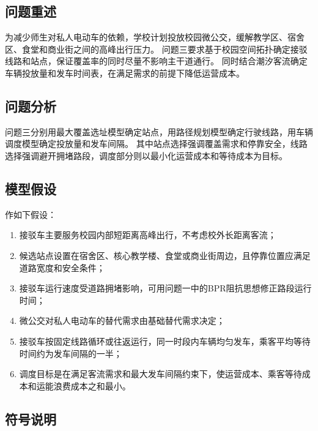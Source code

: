 \documentclass[UTF8,zihao=-4,a4paper]{ctexart}
\numberwithin{table}{section}
\numberwithin{figure}{section}
\numberwithin{equation}{section}
\begin{document}
\subsection{问题重述}

为减少师生对私人电动车的依赖，学校计划投放校园微公交，缓解教学区、宿舍区、食堂和商业街之间的高峰出行压力。
问题三要求基于校园空间拓扑确定接驳线路和站点，保证覆盖率的同时尽量不影响主干道通行。
同时结合潮汐客流确定车辆投放量和发车时间表，在满足需求的前提下降低运营成本。

\subsection{问题分析}

问题三分别用最大覆盖选址模型确定站点，用路径规划模型确定行驶线路，用车辆调度模型确定投放量和发车间隔。
其中站点选择强调覆盖需求和停靠安全，线路选择强调避开拥堵路段，调度部分则以最小化运营成本和等待成本为目标。

\subsection{模型假设}

作如下假设：
\begin{enumerate}
    \item 接驳车主要服务校园内部短距离高峰出行，不考虑校外长距离客流；
    \item 候选站点设置在宿舍区、核心教学楼、食堂或商业街周边，且停靠位置应满足道路宽度和安全条件；
    \item 接驳车运行速度受道路拥堵影响，可用问题一中的BPR阻抗思想修正路段运行时间；
    \item 微公交对私人电动车的替代需求由基础替代需求决定；
    \item 接驳车按固定线路循环或往返运行，同一时段内车辆均匀发车，乘客平均等待时间约为发车间隔的一半；
    \item 调度目标是在满足客流需求和最大发车间隔约束下，使运营成本、乘客等待成本和运能浪费成本之和最小。
\end{enumerate}

\subsection{符号说明}
\end{document}
